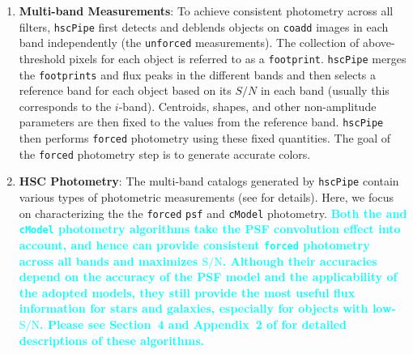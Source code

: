 \documentclass[useamsfonts]{pasj01}
\def\hscpipe{\texttt{hscPipe}}
\def\cmodel{\texttt{cModel}}
\def\forced{\texttt{forced}}
\def\coadd{\texttt{coadd}}
\def\unforced{\texttt{unforced}}
\def\s2n{{$\mathrm{S}/\mathrm{N}$}}
\newcommand{\song}[1]{\textcolor{cyan} {\textbf{#1}}}
\begin{document}
\begin{enumerate}
        \item \textbf{Multi-band Measurements}:
            To achieve consistent photometry across all filters, \hscpipe{} first
            detects and deblends objects on \coadd{} images in each band
            independently (the \unforced{} measurements).
            The collection of above-threshold pixels for each object is referred to as
            a \texttt{footprint}.
            \hscpipe{} merges the \texttt{footprints} and flux peaks in the different
            bands and then selects a reference band for each object based on its $S/N$ 
            in each band (usually this corresponds to the $i$-band).  
            Centroids, shapes, and other non-amplitude parameters are then fixed to  
            the values from the reference band. 
            \hscpipe{} then performs \forced{} photometry using these fixed quantities. 
            The goal of the  \forced{} photometry step is to generate accurate colors.
            
        \item \textbf{HSC Photometry}:
            The multi-band catalogs generated by \hscpipe{} contain various types of 
            photometric measurements (see \citealt{HSCDR1} for details). 
            Here, we focus on characterizing the the \forced{} \texttt{psf} and 
            \cmodel{} photometry. 
            \song{
            Both the \psf{} and \cmodel{} photometry algorithms take the PSF convolution 
            effect into account, and hence can provide consistent \forced{} photometry 
            across all bands and maximizes \s2n{}.  
            Although their accuracies depend on the accuracy of the PSF model and 
            the applicability of the adopted models, they still provide the most useful 
            flux information for stars and galaxies, especially for objects with 
            low-\s2n{}. 
            Please see Section~4 and Appendix~2 of \citet{Bosch2017} for detailed 
            descriptions of these algorithms.  
            }
            
            \begin{itemize}
            

\end{itemize}
\end{enumerate}
\end{document}
